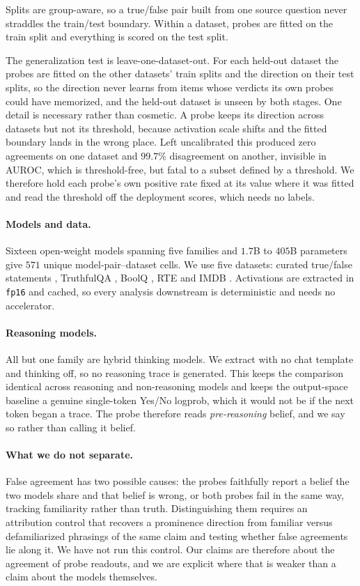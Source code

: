 Splits are group-aware, so a true/false pair built from one source question never
straddles the train/test boundary. Within a dataset, probes are fitted on
the train split and everything is scored on the test split.

The generalization test is leave-one-dataset-out. For each held-out dataset the
probes are fitted on the other datasets' train splits and the direction on their
test splits, so the direction never learns from items whose verdicts its own
probes could have memorized, and the held-out dataset is unseen by both stages.
One detail is necessary rather than cosmetic. A probe keeps
its direction across datasets but not its threshold, because activation scale
shifts and the fitted boundary lands in the wrong place. Left uncalibrated this
produced zero agreements on one dataset and $99.7\%$ disagreement on another,
invisible in AUROC, which is threshold-free, but fatal to a subset defined by a
threshold. We therefore hold each probe's own positive rate fixed at its value
where it was fitted and read the threshold off the deployment scores, which needs
no labels.

\paragraph{Models and data.}
Sixteen open-weight models spanning five families and $1.7$B to $405$B
parameters give $571$ unique model-pair--dataset cells. We use five datasets:
curated true/false statements \citep{marks2024geometry}, TruthfulQA
\citep{lin2022truthfulqa}, BoolQ \citep{clark2019boolq}, RTE
\citep{wang2018glue} and IMDB \citep{maas2011imdb}. Activations are extracted in
\texttt{fp16} and cached, so every analysis downstream is deterministic and needs
no accelerator.

\paragraph{Reasoning models.}
All but one family are hybrid thinking models. We extract with no chat template
and thinking off, so no reasoning trace is generated. This keeps the comparison
identical across reasoning and non-reasoning models and keeps the output-space
baseline a genuine single-token Yes/No logprob, which it would not be if the next
token began a trace. The probe therefore reads \emph{pre-reasoning} belief, and we
say so rather than calling it belief.

\paragraph{What we do not separate.}
False agreement has two possible causes: the probes faithfully report a belief the
two models share and that belief is wrong, or both probes fail in the same way,
tracking familiarity rather than truth. Distinguishing them requires an
attribution control that recovers a prominence direction from familiar versus
defamiliarized phrasings of the same claim and testing whether false agreements lie
along it. We have not run this control. Our claims are therefore about the agreement of
probe readouts, and we are explicit where that is weaker than a claim about the
models themselves.
